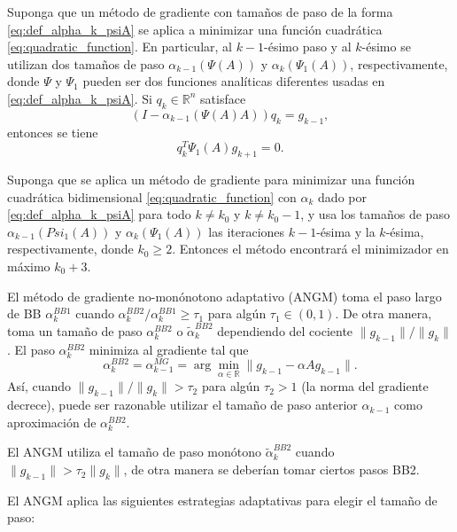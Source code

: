 \begin{lema}
	Suponga que un método de gradiente con tamaños de paso de la forma \ref{eq:def_alpha_k_psiA} se aplica a minimizar una función cuadrática \ref{eq:quadratic_function}. En particular, al $k-1$-ésimo paso y al $k$-ésimo se utilizan dos tamaños de paso $\alpha_{k-1}(\Psi(A))$ y $\alpha_k(\Psi_1(A))$, respectivamente, donde $\Psi$ y $\Psi_1$ pueden ser dos funciones analíticas diferentes usadas en \ref{eq:def_alpha_k_psiA}. Si $q_k\in\mathbb{R}^n$ satisface
	\begin{equation}
		(I-\alpha_{k-1}(\Psi(A)A))q_k = g_{k-1},
	\end{equation}
	entonces se tiene
	\begin{equation}
		q_k^T\Psi_1(A)g_{k+1} = 0.
	\end{equation}
\end{lema}
\begin{teor}
	Suponga que se aplica un método de gradiente para minimizar una función cuadrática bidimensional \ref{eq:quadratic_function} con $\alpha_k$ dado por \ref{eq:def_alpha_k_psiA} para todo $k\neq k_0$ y $k\neq k_0-1$, y usa los tamaños de paso $\alpha_{k-1}(Psi_1(A))$ y $\alpha_k(\Psi_1(A))$ las iteraciones $k-1$-ésima y la $k$-ésima, respectivamente, donde $k_0\geq 2$. Entonces el método encontrará el minimizador en máximo $k_0+3$.
\end{teor}
El método de gradiente no-monónotono adaptativo (ANGM) toma el paso largo de BB $\alpha_k^{BB1}$ cuando $\alpha_k^{BB2}/\alpha_k^{BB1}\geq \tau_1$ para algún $\tau_1\in(0,1)$. De otra manera, toma un tamaño de paso $\alpha_k^{BB2}$ o $\tilde{\alpha}_k^{BB2}$ dependiendo del cociente $\|g_{k-1}\|/\|g_k\|$. El paso $\alpha_k^{BB2}$ minimiza al gradiente tal que
\begin{equation*}
	\alpha_k^{BB2}=\alpha_{k-1}^{MG} =\arg\min_{\alpha\in\mathbb{R}}{\|g_{k-1}-\alpha Ag_{k-1}\|}.
\end{equation*}
Así, cuando $\|g_{k-1}\|/\|g_k\|>\tau_2$ para algún $\tau_2>1$ (la norma del gradiente decrece), puede ser razonable  utilizar el tamaño de paso anterior $\alpha_{k-1}$ como aproximación de $\alpha_k^{BB2}$.
\par El ANGM utiliza el tamaño de paso monótono $\tilde{\alpha}_k^{BB2}$ cuando $\|g_{k-1}\|>\tau_2\|g_k\|$, de otra manera se deberían tomar ciertos pasos BB2.
\par El ANGM aplica las siguientes estrategias adaptativas para elegir el tamaño de paso:
